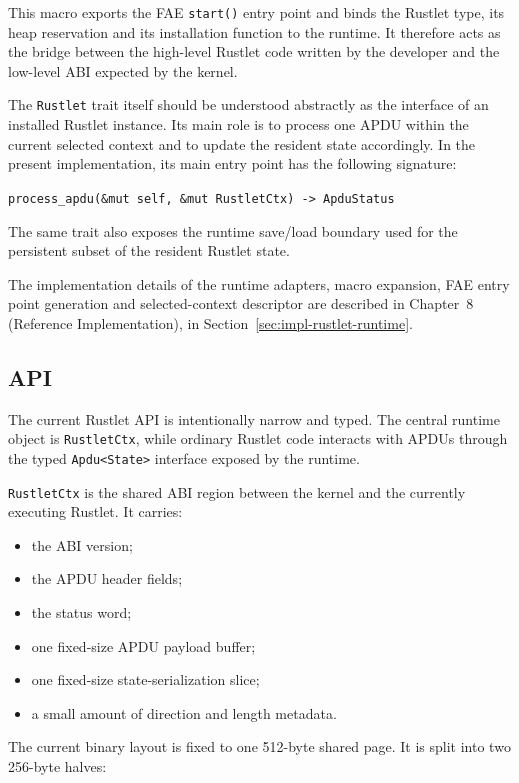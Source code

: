This macro exports the FAE \texttt{start()} entry point and binds the
Rustlet type, its heap reservation and its installation function to the
runtime. It therefore acts as the bridge between the high-level Rustlet
code written by the developer and the low-level ABI expected by the
kernel.

The \texttt{Rustlet} trait itself should be understood abstractly as the
interface of an installed Rustlet instance. Its main role is to process
one APDU within the current selected context and to update the resident
state accordingly. In the present implementation, its main entry point has
the following signature:
\begin{center}
\small\texttt{process\_apdu(\&mut self, \&mut RustletCtx) -> ApduStatus}
\end{center}
The same trait also exposes the runtime save/load boundary used for the
persistent subset of the resident Rustlet state.

The implementation details of the runtime adapters, macro expansion, FAE
entry point generation and selected-context descriptor are described in
Chapter~8 (Reference Implementation), in
Section~\ref{sec:impl-rustlet-runtime}.

\subsection{API}

The current Rustlet API is intentionally narrow and typed. The central runtime
object is \texttt{RustletCtx}, while ordinary Rustlet code interacts with
APDUs through the typed \texttt{Apdu<State>} interface exposed by the
runtime.

\texttt{RustletCtx} is the shared ABI region between the kernel and the
currently executing Rustlet. It carries:
\begin{itemize}
\item the ABI version;
\item the APDU header fields;
\item the status word;
\item one fixed-size APDU payload buffer;
\item one fixed-size state-serialization slice;
\item a small amount of direction and length metadata.
\end{itemize}

The current binary layout is fixed to one 512-byte shared page. It is split
into two 256-byte halves:

